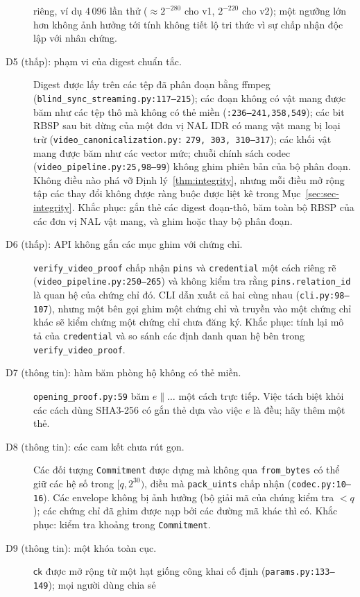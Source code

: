 \begin{description}
  riêng, ví dụ 4\,096 lần thử ($\approx2^{-280}$ cho v1, $2^{-220}$ cho v2);
  một ngưỡng lớn hơn không ảnh hưởng tới tính không tiết lộ tri thức vì sự chấp
  nhận độc lập với nhân chứng.
\item[D5 (thấp): phạm vi của digest chuẩn tắc.] Digest được lấy trên các tệp đã
  phân đoạn bằng ffmpeg (\texttt{blind\_sync\_streaming.py:117--215}); các đoạn
  không có vật mang được băm như các tệp thô mà không có thẻ miền
  (\texttt{:236--241,358,549}); các bit RBSP sau bit dừng của một đơn vị NAL IDR
  có mang vật mang bị loại trừ (\texttt{video\_canonicalization.py:}
  \texttt{279, 303, 310--317});
  các khối vật mang được băm như các vector mức; chuỗi chính sách codec
  (\texttt{video\_pipeline.py:25,98--99}) không ghim phiên bản của bộ phân
  đoạn. Không điều nào phá vỡ Định lý~\ref{thm:integrity}, nhưng mỗi điều mở
  rộng tập các thay đổi không được ràng buộc được liệt kê trong
  Mục~\ref{sec:sec-integrity}. Khắc phục: gắn thẻ các digest đoạn-thô, băm toàn
  bộ RBSP của các đơn vị NAL vật mang, và ghim hoặc thay bộ phân đoạn.
\item[D6 (thấp): API không gắn các mục ghim với chứng chỉ.]
  \texttt{verify\_video\_proof} chấp nhận \texttt{pins} và \texttt{credential}
  một cách riêng rẽ (\texttt{video\_pipeline.py:250--265}) và không kiểm tra
  rằng \texttt{pins.relation\_id} là quan hệ của chứng chỉ đó. CLI dẫn xuất cả
  hai cùng nhau (\texttt{cli.py:98--107}), nhưng một bên gọi ghim một chứng chỉ
  và truyền vào một chứng chỉ khác sẽ kiểm chứng một chứng chỉ chưa đăng ký.
  Khắc phục: tính lại mô tả của \texttt{credential} và so sánh các định danh
  quan hệ bên trong \texttt{verify\_video\_proof}.
\item[D7 (thông tin): hàm băm phòng hộ không có thẻ miền.]
  \texttt{opening\_proof.py:59} băm $e\|\dots$ một cách trực tiếp. Việc tách
  biệt khỏi các cách dùng SHA3-256 có gắn thẻ dựa vào việc $e$ là đều; hãy
  thêm một thẻ.
\item[D8 (thông tin): các cam kết chưa rút gọn.] Các đối tượng
  \texttt{Commitment} được dựng mà không qua \texttt{from\_bytes} có thể giữ
  các hệ số trong $[q,2^{30})$, điều mà \texttt{pack\_uints} chấp nhận
  (\texttt{codec.py:10--16}). Các envelope không bị ảnh hưởng (bộ giải mã của
  chúng kiểm tra $<q$); các chứng chỉ đã ghim được nạp bởi các đường mã khác
  thì có. Khắc phục: kiểm tra khoảng trong \texttt{Commitment}.
\item[D9 (thông tin): một khóa toàn cục.] $\mathsf{ck}$ được mở rộng từ một hạt
  giống công khai cố định (\texttt{params.py:133--149}); mọi người dùng chia sẻ

\end{description}
